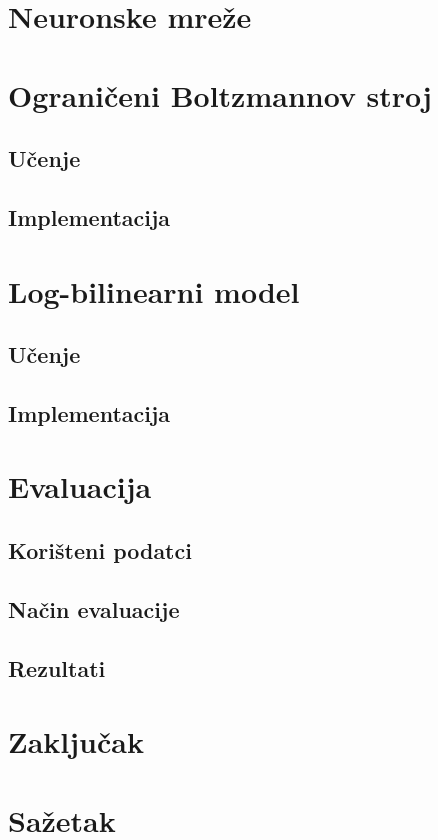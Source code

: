 \documentclass[times, utf8, diplomski, numeric]{fer}
\begin{document}
\chapter{Neuronske mreže}

\chapter{Ograničeni Boltzmannov stroj}

\section{Učenje}

\section{Implementacija}

\chapter{Log-bilinearni model}

\section{Učenje}

\section{Implementacija}

\chapter{Evaluacija}

\section{Korišteni podatci}

\section{Način evaluacije}

\section{Rezultati}

\chapter{Zaključak} 




\chapter{Sažetak}
\end{document}
